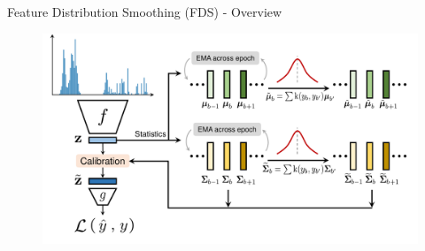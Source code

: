 \begin{frame}{Feature Distribution Smoothing (FDS) - Overview}
	\begin{figure}[h]
		\includegraphics[width=\linewidth]{images/teaser_fds.pdf}
	\end{figure}
\end{frame}

